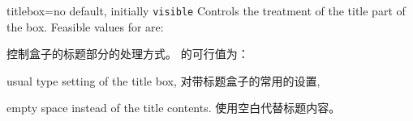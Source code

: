 \begin{docTcbKey}[][doc new=2019-03-01]{titlebox}{=}{no default, initially \texttt{visible}}
Controls the treatment of the title part of the box.
Feasible values for  are:

控制盒子的标题部分的处理方式。  的可行值为：

\begin{DescriptionR}{}
\item[\docValue{visible}]
\begin{tcolorbox}[box align=center,blanker,middle=0mm,before skip=6pt,after skip=6pt]
usual type setting of the title box,
\tcblower
对带标题盒子的常用的设置,
\end{tcolorbox}

\item[\docValue{invisible}]
\begin{tcolorbox}[box align=center,blanker,middle=0mm,before skip=6pt,after skip=6pt]
empty space instead of the title contents.
\tcblower
使用空白代替标题内容。
\end{tcolorbox}
\end{DescriptionR}




\end{docTcbKey}
